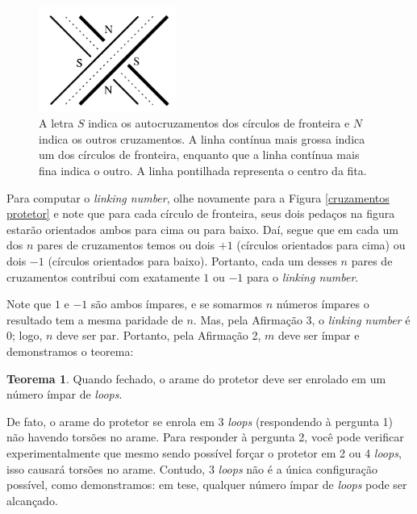 \documentclass[a4paper,portuguese,11pt,twoside, leqno]{book}
\theoremstyle{definition}
\newtheorem{theorem}{Teorema}[section]
\begin{document}
	\begin{figure}[H]
		\begin{center}
			\includegraphics[width=4.5cm]{protetor_fechado.png}
		\end{center}\caption{A letra $S$ indica os autocruzamentos dos círculos de fronteira e $N$ indica os outros cruzamentos. A linha contínua mais grossa indica um dos círculos de fronteira, enquanto que a linha contínua mais fina indica o outro. A linha pontilhada representa o centro da fita.}\label{cruzamentos protetor}
	\end{figure}
	\par\vspace{0.3cm} Para computar o \textit{linking number}, olhe novamente para a Figura \eqref{cruzamentos protetor} e note que para cada círculo de fronteira, seus dois pedaços na figura estarão orientados ambos para cima ou para baixo. Daí, segue que em cada um dos $n$ pares de cruzamentos temos ou dois $+1$ (círculos orientados para cima) ou dois $-1$ (círculos orientados para baixo). Portanto, cada um desses $n$ pares de cruzamentos contribui com exatamente $1$ ou $-1$ para o \textit{linking number}.
	\par\vspace{0.3cm} Note que $1$ e $-1$ são ambos ímpares, e se somarmos $n$ números ímpares o resultado tem a mesma paridade de $n$. Mas, pela Afirmação 3, o \textit{linking number} é $0$; logo, $n$ deve ser par. Portanto, pela Afirmação 2, $m$ deve ser ímpar e demonstramos o teorema:
	\begin{theorem}
		\label{teorema protetor de para-brisa}
		Quando fechado, o arame do protetor deve ser enrolado em um número ímpar de \textit{loops}.
	\end{theorem}  
	\par\vspace{0.3cm} De fato, o arame do protetor se enrola em 3 \textit{loops} (respondendo à pergunta 1) não havendo torsões no arame. Para responder à pergunta 2, você pode verificar experimentalmente que mesmo sendo possível forçar o protetor em 2 ou 4 \textit{loops}, isso causará torsões no arame. Contudo, $3$ \textit{loops} não é a única configuração possível, como demonstramos: em tese, qualquer número ímpar de \textit{loops} pode ser alcançado.
	
\end{document}
